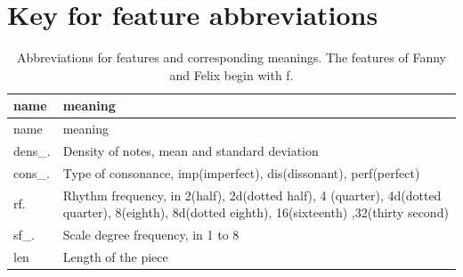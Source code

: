 \documentclass[12pt,twoside]{reedthesis}
\theoremstyle{definition}
\theoremstyle{definition}
\theoremstyle{definition}
\theoremstyle{remark}
\begin{document}
\section{Key for feature
abbreviations}\label{key-for-feature-abbreviations}
\begin{longtable}[]{@{}ll@{}}
\caption{Abbreviations for features and corresponding meanings. The
features of Fanny and Felix begin with f.}\tabularnewline
\toprule
\begin{minipage}[b]{0.11\columnwidth}\raggedright\strut
name\strut
\end{minipage} & \begin{minipage}[b]{0.83\columnwidth}\raggedright\strut
meaning\strut
\end{minipage}\tabularnewline
\midrule
\endfirsthead
\toprule
\begin{minipage}[b]{0.11\columnwidth}\raggedright\strut
name\strut
\end{minipage} & \begin{minipage}[b]{0.83\columnwidth}\raggedright\strut
meaning\strut
\end{minipage}\tabularnewline
\midrule
\endhead
\begin{minipage}[t]{0.11\columnwidth}\raggedright\strut
dens\_.\strut
\end{minipage} & \begin{minipage}[t]{0.83\columnwidth}\raggedright\strut
Density of notes, mean and standard deviation\strut
\end{minipage}\tabularnewline
\begin{minipage}[t]{0.11\columnwidth}\raggedright\strut
cons\_.\strut
\end{minipage} & \begin{minipage}[t]{0.83\columnwidth}\raggedright\strut
Type of consonance, imp(imperfect), dis(dissonant), perf(perfect)\strut
\end{minipage}\tabularnewline
\begin{minipage}[t]{0.11\columnwidth}\raggedright\strut
rf.\strut
\end{minipage} & \begin{minipage}[t]{0.83\columnwidth}\raggedright\strut
Rhythm frequency, in 2(half), 2d(dotted half), 4 (quarter), 4d(dotted
quarter), 8(eighth), 8d(dotted eighth), 16(sixteenth) ,32(thirty
second)\strut
\end{minipage}\tabularnewline
\begin{minipage}[t]{0.11\columnwidth}\raggedright\strut
sf\_.\strut
\end{minipage} & \begin{minipage}[t]{0.83\columnwidth}\raggedright\strut
Scale degree frequency, in 1 to 8\strut
\end{minipage}\tabularnewline
\begin{minipage}[t]{0.11\columnwidth}\raggedright\strut
len\strut
\end{minipage} & \begin{minipage}[t]{0.83\columnwidth}\raggedright\strut
Length of the piece\strut
\end{minipage}\tabularnewline
\bottomrule
\end{longtable}
\end{document}
